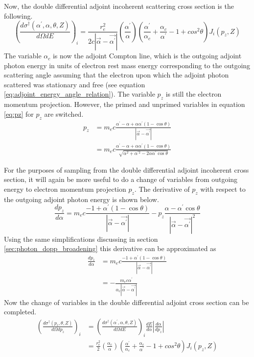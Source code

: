 Now, the double differential adjoint incoherent scattering cross section is
the following.
\begin{equation}
  \left(\frac{d\sigma^{\dagger}(\alpha^{'},\alpha,\theta,Z)}{d\Omega dE}
  \right)_i = \frac{r_e^2}{2c\left|\vec{\alpha}-\vec{\alpha^{'}}\right|}
  \left(\frac{\alpha^{'}}{\alpha}\right)\left(\frac{\alpha^{'}}{\alpha_c} +
  \frac{\alpha_c}{\alpha^{'}} - 1 + cos^2\theta \right) J_i(p_z,Z)
\end{equation}
The variable $\alpha_c$ is now the adjoint Compton line, which is the outgoing
adjoint photon energy in units of electron rest mass energy corresponding to
the outgoing scattering angle assuming that the electron upon which the adjoint
photon scattered was stationary and free (see equation 
\ref{eq:adjoint_energy_angle_relation}). The variable $p_z$ is still the 
electron momentum projection. However, the primed and unprimed variables in 
equation \ref{eq:pz} for $p_z$ are switched.
\begin{align}
  p_z & = m_ec \frac{\alpha^{'}-\alpha + \alpha\alpha^{'}(1-\cos{\theta})}
  {\left|\vec{\alpha}-\vec{\alpha^{'}}\right|} \nonumber \\
  & = m_ec \frac{\alpha^{'}-\alpha + \alpha\alpha^{'}(1-\cos{\theta})}
  {\sqrt{\alpha^2 + \alpha^{'2} - 2\alpha\alpha^{'}\cos{\theta}}} \nonumber
\end{align}

For the purposes of sampling from the double differential adjoint incoherent
cross section, it will again be more useful to do a change of variables from
outgoing energy to electron momentum projection $p_z$. The derivative of $p_z$
with respect to the outgoing adjoint photon energy is shown below.
\begin{equation}
  \frac{dp_z}{d\alpha} = m_ec\frac{-1 + \alpha^{'}(1-\cos{\theta})}
       {\left|\vec{\alpha}-\vec{\alpha^{'}}\right|} - 
       p_z\frac{\alpha-\alpha^{'}\cos{\theta}}
       {\left|\vec{\alpha}-\vec{\alpha^{'}}\right|^2}
\end{equation}
Using the same simplifications discussing in section 
\ref{sec:photon_dopp_broadening} this derivative can be approximated as
\begin{align}
  \frac{dp_z}{d\alpha} & = m_ec\frac{-1 + \alpha^{'}(1-\cos{\theta})}
       {\left|\vec{\alpha}-\vec{\alpha^{'}}\right|} \nonumber \\
   & = - \frac{m_ec \alpha^{'}}
       {\alpha_c\left|\vec{\alpha}-\vec{\alpha^{'}}\right|}
\end{align}
Now the change of variables in the double differential adjoint cross section
can be completed.
\begin{align}
  \left(\frac{d\sigma^{\dagger}(p_z,\theta,Z)}{d\Omega dp_z} \right)_i & = 
  \left(\frac{d\sigma^{\dagger}(\alpha^{'},\alpha,\theta,Z)}{d\Omega dE}
  \right)_i \frac{dE}{d\alpha} \left|\frac{d\alpha}{dp_z}\right| \nonumber \\
  & = \frac{r_e^2}{2} \left(\frac{\alpha_c}{\alpha}\right)
  \left(\frac{\alpha^{'}}{\alpha_c} + \frac{\alpha_c}{\alpha^{'}} - 1 + 
  cos^2\theta \right) J_i(p_z,Z)
\end{align}

